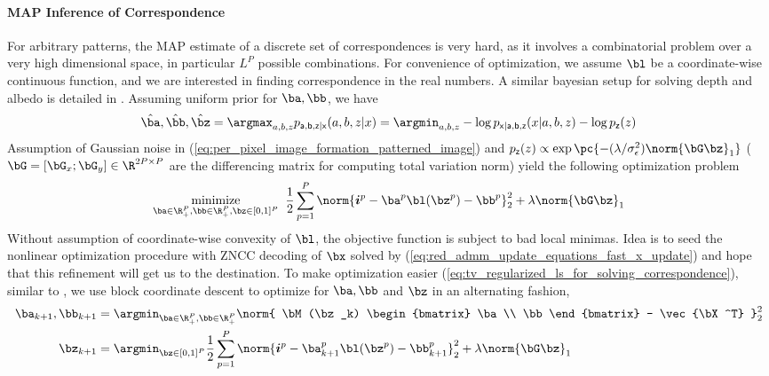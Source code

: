 \documentclass[../writeup.tex]{subfiles}
\begin{document}
\paragraph{MAP Inference of Correspondence}

For arbitrary patterns, the MAP estimate of a discrete set of correspondences is very hard, as it involves a combinatorial problem over a very high dimensional space, in particular $L^P$ possible combinations. For convenience of optimization, we assume $\bl$ be a coordinate-wise continuous function, and we are interested in finding correspondence in the real numbers. A similar bayesian setup for solving depth and albedo is detailed in \cite{adamBayesianTimeofFlightRealtime2015}. Assuming uniform prior for $\ba,\bb$, we have
\begin{align}
    \hat{\ba},\hat{\bb},\hat{\bz}
        = \argmax_{a,b,z} p_{\ra,\rb,\rz|\rx}(a,b,z|x)
        = \argmin_{a,b,z} -\log p_{\rx|\ra,\rb,\rz}(x|a,b,z) - \log p_{\rz}(z)
    \label{eq:map_inference_of_correspondence_is_hard}
\end{align}
Assumption of Gaussian noise in (\ref{eq:per_pixel_image_formation_patterned_image}) and $p_{\rz}(z)\propto \exp\pc{ - (\lambda/\sigma_{\epsilon}^2) \norm{\bG \bz}_1 }$ ($\bG=[\bG_x;\bG_y]\in \R^{2P\times P}$ are the differencing matrix for computing total variation norm) yield the following optimization problem
\begin{align}
    \underset{ \ba\in\R_+^P,\bb\in\R_+^P,\bz\in [0,1]^P }{\text{minimize}}\;\;
        \frac{1}{2} \sum_{ p=1 }^P \norm{ \si^p - \ba^p \bl(\bz^p) - \bb^p }_2^2 + \lambda \norm{\bG \bz}_1
    \label{eq:tv_regularized_ls_for_solving_correspondence}
\end{align}
Without assumption of coordinate-wise convexity of $\bl$, the objective function is subject to bad local minimas. Idea is to seed the nonlinear optimization procedure with ZNCC decoding of $\bx$ solved by (\ref{eq:red_admm_update_equations_fast_x_update}) and hope that this refinement will get us to the destination. To make optimization easier (\ref{eq:tv_regularized_ls_for_solving_correspondence}), similar to \cite{rosmanSparseModelingShape2012}, we use block coordinate descent to optimize for $\ba,\bb$ and $\bz$ in an alternating fashion,
\begin{align}
    \ba_{k+1},\bb_{k+1}
        &= \argmin_{\ba\in\R_+^P,\bb\in\R_+^P} \norm{ \bM(\bz_k) \begin{bmatrix}
            \ba \\ \bb
        \end{bmatrix} - \vec{\bX^T} }_2^2 
    \label{eq:tv_regularized_ls_for_solving_correspondence_altmin_1} \\
    \bz_{k+1}
        &= \argmin_{\bz\in[0,1]^P} \frac{1}{2} \sum_{ p=1 }^P \norm{ \si^p - \ba_{k+1}^p \bl(\bz^p) - \bb_{k+1}^p }_2^2 + \lambda \norm{\bG \bz}_1 
    \label{eq:tv_regularized_ls_for_solving_correspondence_altmin_2}
\end{align}
\end{document}

